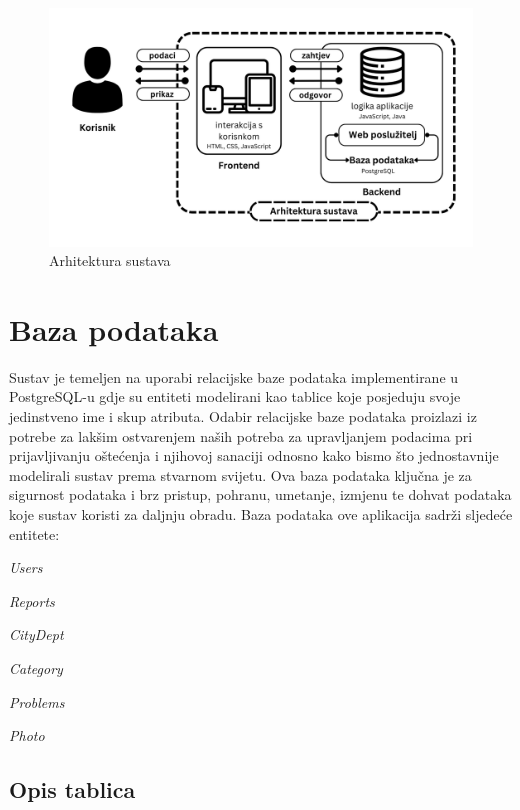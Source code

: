 \begin{figure}[H]
	\includegraphics[scale=0.25]{slike/Arhitektura_sustava.png} %
	\centering
	\caption{Arhitektura sustava}
	\label{fig:Arhitektura}
\end{figure}


\section{Baza podataka}

\noindent Sustav je temeljen na uporabi relacijske baze podataka implementirane u PostgreSQL-u gdje su entiteti modelirani kao tablice koje posjeduju svoje jedinstveno ime i skup atributa.
Odabir relacijske baze podataka proizlazi iz potrebe za lakšim ostvarenjem naših potreba za upravljanjem podacima pri prijavljivanju oštećenja i njihovoj sanaciji
odnosno kako bismo što jednostavnije modelirali sustav prema stvarnom svijetu.
Ova baza podataka ključna je za sigurnost podataka i brz pristup, pohranu, umetanje, izmjenu te dohvat podataka koje sustav koristi za daljnju obradu.
Baza podataka ove aplikacija sadrži sljedeće entitete:
\begin{packed_item}
	\item \textit{Users}
	\item \textit{Reports}
	\item \textit{CityDept}
	\item \textit{Category}
	\item \textit{Problems}
	\item \textit{Photo}
\end{packed_item}



\subsection{Opis tablica}

